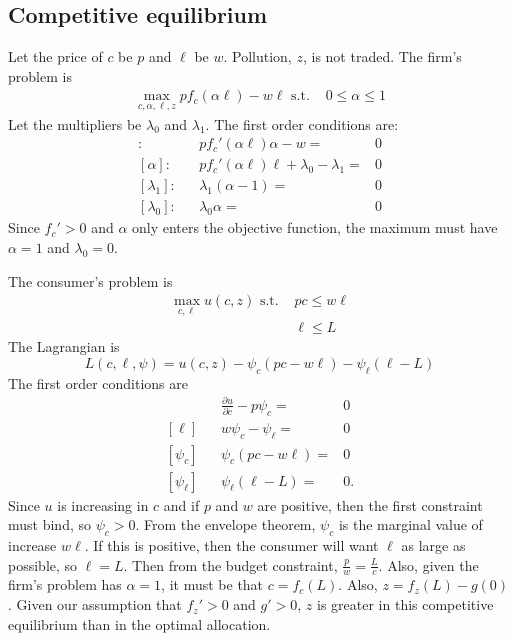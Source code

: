 \documentclass[12pt,reqno]{amsart}
\theoremstyle{definition}
\begin{document}
\subsection{Competitive equilibrium}

Let the price of $c$ be $p$ and $\ell$ be $w$. Pollution, $z$, is not
traded. The firm's problem is
\begin{align*}
  \max_{c,\alpha,\ell,z} p f_c(\alpha \ell) - w \ell \text{ s.t. } & 0
  \leq \alpha \leq 1 
\end{align*}
Let the multipliers be $\lambda_0$ and $\lambda_1$. The first order conditions are: 
\begin{align*} 
  [\ell]: & & p f_c'(\alpha \ell) \alpha - w = & 0 \\
  [\alpha]: & & p f_c'(\alpha \ell) \ell + \lambda_{0} -
  \lambda_{1} = & 0 \\ 
  [\lambda_{1}]: && \lambda_{1}(\alpha -1) = & 0 \\
  [\lambda_{0}]: && \lambda_{0}\alpha = & 0 
\end{align*}
Since $f_c'>0$ and $\alpha$ only enters the objective function, the
maximum must have $\alpha = 1$ and $\lambda_0 = 0$. 

The consumer's problem is
\begin{align*}
  \max_{c,\ell} u(c,z) \text{ s.t. } & pc \leq w \ell \\
  & \ell \leq L 
\end{align*}
The Lagrangian is
\[ L(c,\ell,\psi) = u(c,z) - \psi_c(pc - w\ell) - \psi_\ell (\ell -L) \]
The first order conditions are
\begin{align*}
  [c]&& \frac{\partial u}{\partial c} - p \psi_c = & 0 \\
  [\ell]&&  w \psi_c - \psi_\ell = & 0 \\
  [\psi_c]&& \psi_c(pc-w\ell) = & 0 \\
  [\psi_\ell] && \psi_\ell(\ell-L) = & 0.
\end{align*}
Since $u$ is increasing in $c$ and if $p$ and $w$ are positive, then
the first constraint must bind, so $\psi_c>0$. From the envelope
theorem, $\psi_c$ is the marginal value of increase $w\ell$. If this
is positive, then the consumer will want $\ell$ as large as possible,
so $\ell = L$. Then from the budget constraint, $\frac{p}{w} =
\frac{L}{c}$. Also, given the firm's problem has $\alpha=1$, it must
be that $c = f_c(L)$. Also, $z = f_z(L) - g(0)$. Given our assumption
that $f_z'>0$ and $g'>0$, $z$ is greater in this competitive
equilibrium than in the optimal allocation.
\end{document}
